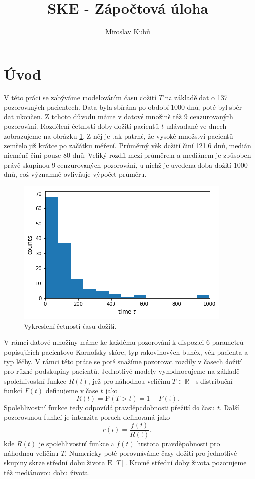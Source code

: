 \documentclass[10pt]{article}
\begin{document}
\title{SKE - Zápočtová úloha}
\author{Miroslav Kubů}

\maketitle
\setlength{\footskip}{28pt}

\section{Úvod}
V této práci se zabýváme modelováním času dožití $T$ na základě dat o 137 pozorovaných pacientech. Data byla sbírána po období 1000 dnů, poté byl sběr dat ukončen. Z tohoto důvodu máme v datové množině též 9 cenzurovaných pozorování. Rozdělení četností doby dožití pacientů $t$ udávadané ve dnech zobrazujeme na obrázku \ref{fig:histo}. Z něj je tak patrné, že vysoké množství pacientů zemřelo již krátce po začátku měření. Průměrný věk dožití činí 121.6 dnů, medián nicméně činí pouze 80 dnů. Veliký rozdíl mezi průměrem a mediánem je způsoben právě skupinou 9 cenzurovaných pozorování, u nichž je uvedena doba dožití 1000 dnů, což významně ovlivňuje výpočet průměru.
\begin{figure}[htb!]
\centering
    \includegraphics[width=.6\textwidth]{Images/hist.png}
  \caption{Vykreslení četností času dožití.}\label{fig:histo} 
    \end{figure}
V rámci datové množiny máme ke každému pozorování k dispozici 6 parametrů popisujících pacientovo Karnofsky skóre, typ rakovinových buněk, věk pacienta a typ léčby. V rámci této práce se poté snažíme pozorovat rozdíly v časech dožití pro různé podskupiny pacientů. Jednotlivé modely vyhodnocujeme na základě spolehlivostní funkce $R(t)$, jež pro náhodnou veličinu $T \in \mathbb{R}^+$ s distribuční funkcí $F(t)$ definujeme v čase $t$ jako 
\begin{equation}\label{spol}
R(t)=\textrm{P}(T>t)=1-F(t).
\end{equation}
Spolehlivostní funkce tedy odpovídá pravděpodobnosti přežití do času $t$. Další pozorovanou funkcí je intenzita poruch definovaná jako
\begin{equation}\label{poruch}
r(t)=\frac{f(t)}{R(t)},
\end{equation}
kde $R(t)$ je spolehlivostní funkce a $f(t)$ hustota pravděpobnosti pro náhodnou veličinu $T$. Numericky poté porovnáváme časy dožití pro jednotlivé skupiny skrze střední dobu života $ \textrm{E}[T]$. Kromě střední doby života pozorujeme též mediánovou dobu života.
\end{document}
